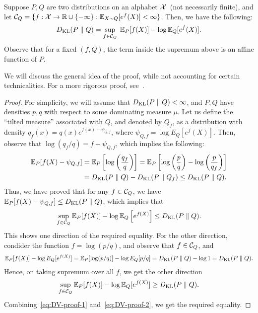 \documentclass[12pt]{article}
\begin{document}
\begin{theorem}
\label{theorem:Donsker-Varadhan} Suppose $P, Q$ are two distributions on an alphabet ${\cal X}$~(not necessarily finite), and let ${\cal C}_Q = \{f:{\cal X} \to \mathbb{R} \cup \{-\infty\}: \mathbb{E}_{X \sim Q}[e^f(X)] < \infty \}$. Then, we have the following: 
\begin{align}
D_{\text{KL}}(P \parallel Q) = \sup_{f \in {\cal C}_Q}\; \mathbb{E}_P[f(X)] -  \log \mathbb{E}_Q[e^f(X)]. 
\end{align}
Observe that for a fixed $(f, Q)$, the term inside the supremum above is an affine function of $P$. 
\end{theorem}
We will discuss the general idea of the proof, while not accounting for certain technicalities. For a more rigorous proof, see~\citep[Section 4.3]{polyanskiy2025information}. 

\begin{proof}
For simplicity,  we will assume that $D_{\text{KL}}(P \parallel Q) < \infty$, and $P, Q$ have densities $p, q$ with respect to some dominating measure $\mu$. Let us define the ``tilted measure'' associated with $Q$, and denoted by $Q_f$, as a distribution with density $q_f(x) = q(x) e^{f(x) - \psi_{Q,f}}$, where $\psi_{Q,f} = \log E_Q[e^f(X)]$. Then, observe that $\log(q_f/q) = f - \psi_{Q,f}$, which implies the following: 
\begin{align}
	\mathbb{E}_P[f(X) - \psi_{Q,f}] &= \mathbb{E}_P\left[ \log \left( \frac{q_f}{q} \right) \right] = \mathbb{E}_P\left[ \log \left( \frac{p}{q} \right) - \log \left( \frac{p}{q_f} \right)  \right]  \\
	& = D_{\text{KL}}(P \parallel Q) - D_{\text{KL}}(P \parallel Q_f) \leq D_{\text{KL}}(P \parallel Q). 
\end{align}
Thus, we have proved that for any $f \in {\cal C}_Q$, we have $\mathbb{E}_P[f(X) - \psi_{Q,f}] \leq D_{\text{KL}}(P  \parallel Q)$, which implies that 
\begin{align}
\sup_{f \in {\cal C}_Q} \mathbb{E}_P[f(X)] - \log \mathbb{E}_Q\left[ e^{f(X)} \right] \leq D_{\text{KL}}(P \parallel Q). \label{eq:DV-proof-1}
\end{align}
This shows one direction of the required equality. For the other direction, condider the function $f = \log (p/q)$, and observe that $f \in {\cal C}_Q$, and 
\begin{align}
\mathbb{E}_P[f(X)] - \log E_Q[e^{f(X)}] = \mathbb{E}_P[\log(p/q)] - \log E_Q[p/q] = D_{\text{KL}}(P \parallel Q) - \log 1 = D_{\text{KL}}(P \parallel Q). 
\end{align}
Hence, on taking supremum over all $f$, we get the other direction 
\begin{align}
\sup_{f \in {\cal C}_Q} \mathbb{E}_P[f(X)] - \log \mathbb{E}_Q[e^{f(X)}] \geq D_{\text{KL}}(P \parallel Q). \label{eq:DV-proof-2}
\end{align}
Combining~\eqref{eq:DV-proof-1} and~\eqref{eq:DV-proof-2}, we get the required equality. 
\end{proof}
\end{document}
